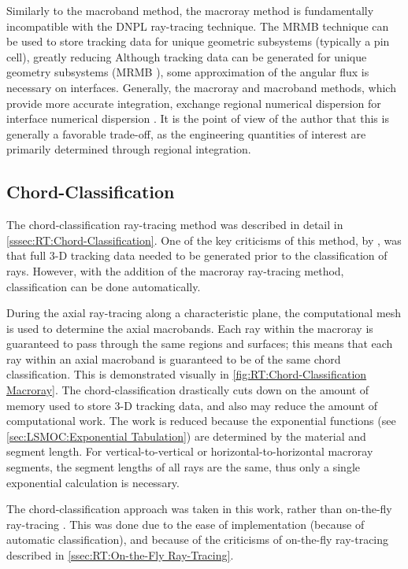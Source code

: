 {{    Similarly to the macroband method, the macroray method is fundamentally incompatible with the \ac{DNPL} ray-tracing technique.
    The \ac{MRMB} technique can be used to store tracking data for unique geometric subsystems (typically a pin cell), greatly reducing
    Although tracking data can be generated for unique geometry subsystems (\ac{MRMB} \cite{Yamamoto2005}), some approximation of the angular flux is necessary on interfaces.
    Generally, the macroray and macroband methods, which provide more accurate integration, exchange regional numerical dispersion for interface numerical dispersion \cite{Sanchez2012}.
    It is the point of view of the author that this is generally a favorable trade-off, as the engineering quantities of interest are primarily determined through regional integration.

    \subsection{Chord-Classification}{\label{ssec:MR:Chord-Classification}
      The chord-classification ray-tracing method \cite{Sciannandrone2016} was described in detail in \cref{sssec:RT:Chord-Classification}.
      One of the key criticisms of this method, by \citet{Gunow2018}, was that full 3-D tracking data needed to be generated prior to the classification of rays.
      However, with the addition of the macroray ray-tracing method, classification can be done automatically.

      During the axial ray-tracing along a characteristic plane, the computational mesh is used to determine the axial macrobands.
      Each ray within the macroray is guaranteed to pass through the same regions and surfaces; this means that each ray within an axial macroband is guaranteed to be of the same chord classification.
      This is demonstrated visually in \cref{fig:RT:Chord-Classification Macroray}.
      The chord-classification drastically cuts down on the amount of memory used to store 3-D tracking data, and also may reduce the amount of computational work.
      The work is reduced because the exponential functions (see \cref{sec:LSMOC:Exponential Tabulation}) are determined by the material and segment length.
      For vertical-to-vertical or horizontal-to-horizontal macroray segments, the segment lengths of all rays are the same, thus only a single exponential calculation is necessary.

      The chord-classification approach was taken in this work, rather than on-the-fly ray-tracing \cite{Gunow2018}.
      This was done due to the ease of implementation (because of automatic classification), and because of the criticisms of on-the-fly ray-tracing described in \cref{ssec:RT:On-the-Fly Ray-Tracing}.

}}}
